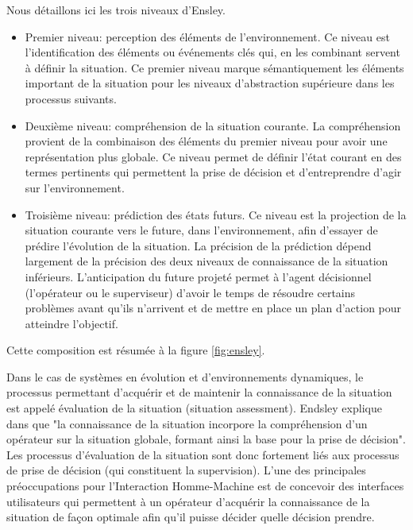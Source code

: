 \documentclass[a4paper,11pt,twoside]{StyleThese}
\begin{document}
Nous détaillons ici les trois niveaux d'Ensley.
\begin{itemize}
\item Premier niveau: perception des éléments de l'environnement. Ce niveau est l'identification des
éléments ou événements clés qui, en les combinant servent à définir la situation.
Ce premier niveau marque sémantiquement les éléments important de la situation pour
les niveaux d'abstraction supérieure dans les processus suivants.
\item Deuxième niveau: compréhension de la situation courante. La compréhension provient de 
la combinaison des éléments du premier niveau pour avoir une représentation plus globale. Ce niveau permet de
définir l'état courant en des termes pertinents qui permettent la prise de 
décision et d'entreprendre d'agir sur l'environnement.
\item Troisième niveau: prédiction des états futurs. Ce niveau est la projection de la situation courante vers le future, dans l'environnement, afin d'essayer de prédire l'évolution de la situation. La précision de la prédiction dépend largement de la précision des deux niveaux de connaissance de la situation inférieurs. L'anticipation du future projeté permet à l'agent décisionnel (l'opérateur ou le superviseur) d'avoir le temps de résoudre certains problèmes avant qu'ils n'arrivent et de mettre en place un plan d'action pour atteindre l'objectif.
\end{itemize}
Cette composition est résumée à la figure \ref{fig:ensley}.

Dans le cas de systèmes en évolution et d'environnements dynamiques, le processus permettant d'acquérir et de maintenir la connaissance de la situation est appelé évaluation de la situation (situation assessment). Endsley explique dans \cite{endsley1995} que "la connaissance de la situation incorpore la compréhension d'un opérateur sur la situation globale, formant ainsi la base pour la prise de décision". Les processus d'évaluation de la situation sont donc fortement liés aux processus de prise de décision (qui constituent la supervision).
L'une des principales préoccupations pour l'Interaction Homme-Machine est de concevoir des interfaces utilisateurs qui permettent à un opérateur d'acquérir la connaissance de la situation de façon optimale afin qu'il puisse décider quelle décision prendre.
\end{document}
